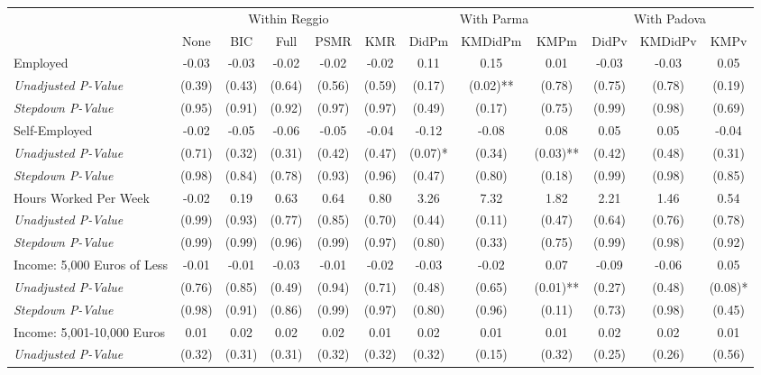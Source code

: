\begin{tabular}{l c c c c c c c c c c c}
\toprule
& \multicolumn{5}{c}{Within Reggio} & \multicolumn{3}{c}{With Parma} & \multicolumn{3}{c}{With Padova} \\\cmidrule(lr){2-6} \cmidrule(lr){7-9} \cmidrule(lr){10-12}
 & None & BIC & Full & PSMR & KMR & DidPm & KMDidPm & KMPm & DidPv & KMDidPv & KMPv \\
\midrule
Employed & -0.03 & -0.03 & -0.02 & -0.02 & -0.02 & 0.11 & 0.15 & 0.01 & -0.03 & -0.03 & 0.05 \\
\quad \textit{Unadjusted P-Value} & (0.39) & (0.43) & (0.64) & (0.56) & (0.59) & (0.17) & (0.02)** & (0.78) & (0.75) & (0.78) & (0.19) \\
\quad \textit{Stepdown P-Value} & (0.95) & (0.91) & (0.92) & (0.97) & (0.97) & (0.49) & (0.17) & (0.75) & (0.99) & (0.98) & (0.69) \\
Self-Employed & -0.02 & -0.05 & -0.06 & -0.05 & -0.04 & -0.12 & -0.08 & 0.08 & 0.05 & 0.05 & -0.04 \\
\quad \textit{Unadjusted P-Value} & (0.71) & (0.32) & (0.31) & (0.42) & (0.47) & (0.07)* & (0.34) & (0.03)** & (0.42) & (0.48) & (0.31) \\
\quad \textit{Stepdown P-Value} & (0.98) & (0.84) & (0.78) & (0.93) & (0.96) & (0.47) & (0.80) & (0.18) & (0.99) & (0.98) & (0.85) \\
Hours Worked Per Week & -0.02 & 0.19 & 0.63 & 0.64 & 0.80 & 3.26 & 7.32 & 1.82 & 2.21 & 1.46 & 0.54 \\
\quad \textit{Unadjusted P-Value} & (0.99) & (0.93) & (0.77) & (0.85) & (0.70) & (0.44) & (0.11) & (0.47) & (0.64) & (0.76) & (0.78) \\
\quad \textit{Stepdown P-Value} & (0.99) & (0.99) & (0.96) & (0.99) & (0.97) & (0.80) & (0.33) & (0.75) & (0.99) & (0.98) & (0.92) \\
Income: 5,000 Euros of Less & -0.01 & -0.01 & -0.03 & -0.01 & -0.02 & -0.03 & -0.02 & 0.07 & -0.09 & -0.06 & 0.05 \\
\quad \textit{Unadjusted P-Value} & (0.76) & (0.85) & (0.49) & (0.94) & (0.71) & (0.48) & (0.65) & (0.01)** & (0.27) & (0.48) & (0.08)* \\
\quad \textit{Stepdown P-Value} & (0.98) & (0.91) & (0.86) & (0.99) & (0.97) & (0.80) & (0.96) & (0.11) & (0.73) & (0.98) & (0.45) \\
Income: 5,001-10,000 Euros & 0.01 & 0.02 & 0.02 & 0.02 & 0.01 & 0.02 & 0.01 & 0.01 & 0.02 & 0.02 & 0.01 \\
\quad \textit{Unadjusted P-Value} & (0.32) & (0.31) & (0.31) & (0.32) & (0.32) & (0.32) & (0.15) & (0.32) & (0.25) & (0.26) & (0.56) \\

\end{tabular}
